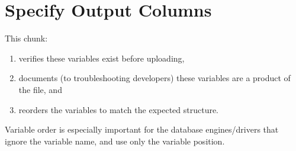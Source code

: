 \documentclass[
]{book}
\newenvironment{Shaded}{\begin{snugshade}}{\end{snugshade}}
\newcommand{\CharTok}[1]{\textcolor[rgb]{0.31,0.60,0.02}{#1}}
\newcommand{\DataTypeTok}[1]{\textcolor[rgb]{0.13,0.29,0.53}{#1}}
\newcommand{\DecValTok}[1]{\textcolor[rgb]{0.00,0.00,0.81}{#1}}
\newcommand{\KeywordTok}[1]{\textcolor[rgb]{0.13,0.29,0.53}{\textbf{#1}}}
\newcommand{\NormalTok}[1]{#1}
\newcommand{\OperatorTok}[1]{\textcolor[rgb]{0.81,0.36,0.00}{\textbf{#1}}}
\newcommand{\StringTok}[1]{\textcolor[rgb]{0.31,0.60,0.02}{#1}}
\providecommand{\tightlist}{%
  \setlength{\itemsep}{0pt}\setlength{\parskip}{0pt}}
\begin{document}
\begin{Shaded}
\end{Shaded}

\hypertarget{chunk-specify-columns}{%
\section{Specify Output Columns}\label{chunk-specify-columns}}

This chunk:

\begin{enumerate}
\def\labelenumi{\arabic{enumi}.}
\tightlist
\item
  verifies these variables exist before uploading,
\item
  documents (to troubleshooting developers) these variables are a product of the file, and
\item
  reorders the variables to match the expected structure.
\end{enumerate}

Variable order is especially important for the database engines/drivers that ignore the variable name, and use only the variable position.
\end{document}
